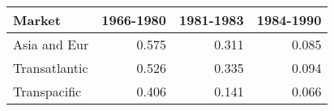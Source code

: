 
\begin{tabular}[t]{lrrr}
\toprule
Market & 1966-1980 & 1981-1983 & 1984-1990\\
\midrule
Asia and Eur & 0.575 & 0.311 & 0.085\\
Transatlantic & 0.526 & 0.335 & 0.094\\
Transpacific & 0.406 & 0.141 & 0.066\\
\bottomrule
\end{tabular}
